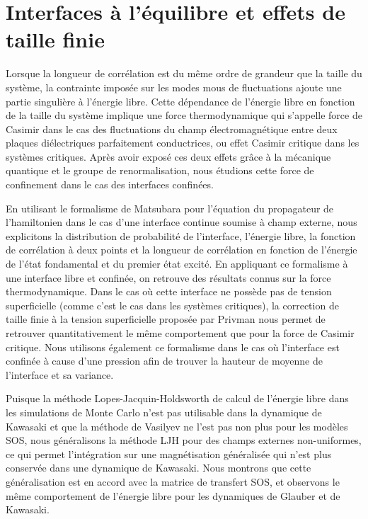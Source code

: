 \section*{Interfaces à l'équilibre et effets de taille finie}

Lorsque la longueur de corrélation est du même ordre de grandeur que la taille du système, la contrainte imposée sur les modes mous de fluctuations ajoute une partie singulière à l'énergie libre. Cette dépendance de l'énergie libre en fonction de la taille du système implique une force thermodynamique qui s'appelle force de Casimir dans le cas des fluctuations du champ électromagnétique entre deux plaques diélectriques parfaitement conductrices, ou effet Casimir critique dans les systèmes critiques. Après avoir exposé ces deux effets grâce à la mécanique quantique et le groupe de renormalisation, nous étudions cette force de confinement dans le cas des interfaces confinées. 

En utilisant le formalisme de Matsubara pour l'équation du propagateur de l'hamiltonien dans le cas d'une interface continue soumise à champ externe, nous explicitons la distribution de probabilité de l'interface, l'énergie libre, la fonction de corrélation à deux points et la longueur de corrélation en fonction de l'énergie de l'état fondamental et du premier état excité. En appliquant ce formalisme à une interface libre et confinée, on retrouve des résultats connus sur la force thermodynamique. Dans le cas où cette interface ne possède pas de tension superficielle (comme c'est le cas dans les systèmes critiques), la correction de taille finie à la tension superficielle proposée par Privman nous permet de retrouver quantitativement le même comportement que pour la force de Casimir critique. Nous utilisons également ce formalisme dans le cas où l'interface est confinée à cause d'une pression afin de trouver la hauteur de moyenne de l'interface et sa variance.

Puisque la méthode Lopes-Jacquin-Holdsworth de calcul de l'énergie libre dans les simulations de Monte Carlo n'est pas utilisable dans la dynamique de Kawasaki et que la méthode de Vasilyev ne l'est pas non plus pour les modèles SOS, nous généralisons la méthode LJH pour des champs externes non-uniformes, ce qui permet l'intégration sur une magnétisation généralisée qui n'est plus conservée dans une dynamique de Kawasaki. Nous montrons que cette généralisation est en accord avec la matrice de transfert SOS, et observons le même comportement de l'énergie libre pour les dynamiques de Glauber et de Kawasaki.

